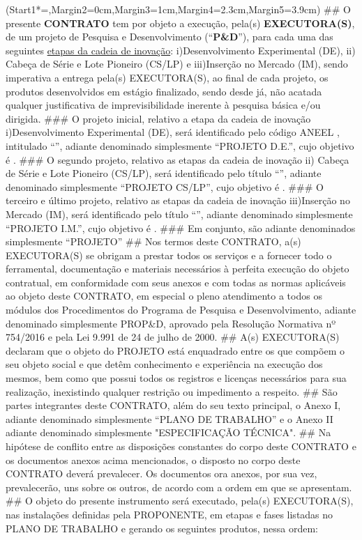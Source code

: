 \begin{easylist}
    \ListProperties(Start1*=\thechapter,Margin2=0cm,Margin3=1cm,Margin4=2.3cm,Margin5=3.9cm)
    ## O presente \textbf{CONTRATO} tem por objeto a execução, pela(s) \textbf{EXECUTORA(S)}, de um projeto de Pesquisa e Desenvolvimento (“\textbf{P\&D}”), para cada uma das seguintes \uline{etapas da cadeia de inovação}: i)Desenvolvimento Experimental (DE), ii) Cabeça de Série  e Lote Pioneiro (CS/LP) e iii)Inserção no Mercado (IM), sendo imperativa a entrega pela(s) EXECUTORA(S), ao final de cada projeto, os produtos desenvolvidos em estágio finalizado, sendo desde já, não acatada qualquer justificativa de imprevisibilidade inerente à pesquisa básica e/ou dirigida.
		### O projeto inicial, relativo a etapa da cadeia de inovação i)Desenvolvimento Experimental (DE),  será identificado pelo código ANEEL \CodAneelProjeto, intitulado “\TituloCompletoProjetoDE”, adiante denominado simplesmente “PROJETO D.E.”, cujo objetivo é \ObjetivoResumidoDoProjetoDE.
        ### O segundo projeto, relativo as etapas da cadeia de inovação ii) Cabeça de Série  e Lote Pioneiro (CS/LP), será identificado pelo título “\TituloCompletoProjetoCS”, adiante denominado simplesmente “PROJETO CS/LP”, cujo objetivo é \ObjetivoResumidoDoProjetoCS.
        ### O terceiro e último projeto, relativo as etapas da cadeia de inovação iii)Inserção no Mercado (IM),  será identificado pelo título “\TituloCompletoProjetoIM”, adiante denominado simplesmente “PROJETO I.M.”, cujo objetivo é \ObjetivoResumidoDoProjetoIM.
		### Em conjunto, são adiante denominados simplesmente “PROJETO”
	## Nos termos deste CONTRATO, a(s) EXECUTORA(S) se obrigam a prestar todos os serviços e a fornecer todo o ferramental, documentação e materiais necessários à perfeita execução do objeto contratual, em conformidade com seus anexos e com todas as normas aplicáveis ao objeto deste CONTRATO, em especial o pleno atendimento a todos os módulos dos Procedimentos do Programa de Pesquisa e Desenvolvimento, adiante denominado simplesmente PROP\&D, aprovado pela Resolução Normativa nº 754/2016 e pela Lei 9.991 de 24 de julho de 2000.
	## A(s) EXECUTORA(S) declaram que o objeto do PROJETO está enquadrado entre os que compõem o seu objeto social e que detêm conhecimento e experiência na execução dos mesmos, bem como que possui todos os registros e licenças necessários para sua realização, inexistindo qualquer restrição ou impedimento a respeito.
	## São partes integrantes deste CONTRATO, além do seu texto principal, o Anexo I, adiante denominado simplesmente “PLANO DE TRABALHO” e o Anexo II adiante denominado simplesmente "ESPECIFICAÇÃO TÉCNICA".
	## Na hipótese de conflito entre as disposições constantes do corpo deste CONTRATO e os documentos anexos acima mencionados, o disposto no corpo deste CONTRATO deverá prevalecer. Os documentos ora anexos, por sua vez, prevalecerão, uns sobre os outros, de acordo com a ordem em que se apresentam.
	## O objeto do presente instrumento será executado, pela(s) EXECUTORA(S), nas instalações definidas pela PROPONENTE, em etapas e fases listadas no PLANO DE TRABALHO e gerando os seguintes produtos, nessa ordem:
	

\end{easylist}
